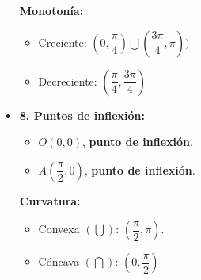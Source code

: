\begin{itemize}
\begin{itemize}
	\end{itemize}
	\textbf{Monotonía: }\\
	\begin{itemize}
		\item Creciente: $(0, \dfrac{\pi}{4}) \bigcup (\dfrac{3\pi}{4}, \pi))$
		\item Decreciente: $(\dfrac{\pi}{4}, \dfrac{3\pi}{4})$
	\end{itemize}
	\item \textbf{8. Puntos de inflexión:}\\
	\begin{itemize}
		\item $O(0,0)$, \textbf{punto de inflexión}.
		\item $A(\dfrac{\pi}{2},0)$, \textbf{punto de inflexión}.
	\end{itemize}
	\textbf{Curvatura: }\\
	\begin{itemize}
		\item Convexa $(\bigcup)$: $(\dfrac{\pi}{2}, \pi)$.
		\item Cóncava $(\bigcap)$: $(0, \dfrac{\pi}{2})$
	\end{itemize}
\end{itemize}
